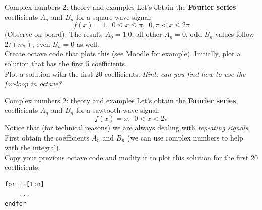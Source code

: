\documentclass{beamer}
\begin{document}
\begin{frame}{Complex numbers 2: theory and examples}
Let's obtain the \alert{\textbf{Fourier series}} coefficients $A_n$ and $B_n$ for a square-wave signal:
\begin{equation}
f(x) = 1, ~~ 0 \leq x \leq \pi, ~~ 0,  \pi < x \leq 2\pi 
\end{equation}
(Observe on board).  The result: $A_0 = 1.0$, all other $A_n = 0$, odd $B_n$ values follow $2/(n\pi)$, even $B_n = 0$ as well. \\ \vspace{0.5cm}
Create octave code that plots this (see Moodle for example).  Initially, plot a solution that has the first 5 coefficients. \\ \vspace{0.5cm}
\alert{Plot a solution with the first 20 coefficients.}  \textit{Hint: can you find how to use the for-loop in octave?}
\end{frame}

\begin{frame}[fragile]{Complex numbers 2: theory and examples}
Let's obtain the \alert{\textbf{Fourier series}} coefficients $A_n$ and $B_n$ for a sawtooth-wave signal:
\begin{equation}
f(x) = x, ~~ 0 < x < 2\pi
\end{equation}
Notice that (for technical reasons) we are always dealing with \textit{repeating signals}.
First obtain the coefficients $A_n$ and $B_n$ (we can use complex numbers to help with the integral). \\ \vspace{0.5cm}
\alert{Copy your previous octave code and modify it to plot this solution for the first 20 coefficients.}
\begin{verbatim}
for i=[1:n]
    ...
endfor
\end{verbatim}
\end{frame}
\end{document}
